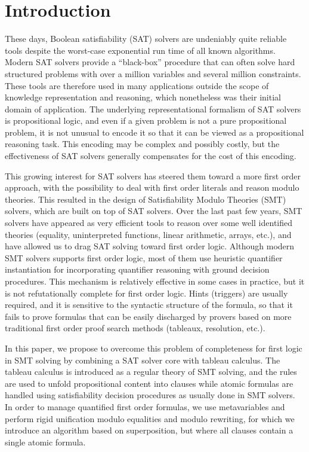 
\section{Introduction}

These days, Boolean satisfiability (SAT) solvers are undeniably quite reliable
tools despite the worst-case exponential run time of all known
algorithms. Modern SAT solvers provide a ``black-box'' procedure that can often
solve hard structured problems with over a million variables and several million
constraints. These tools are therefore used in many applications outside the
scope of knowledge representation and reasoning, which nonetheless was their
initial domain of application. The underlying representational formalism of SAT
solvers is propositional logic, and even if a given problem is not a pure
propositional problem, it is not unusual to encode it so that it can be viewed
as a propositional reasoning task. This encoding may be complex and possibly
costly, but the effectiveness of SAT solvers generally compensates for the cost
of this encoding.

This growing interest for SAT solvers has steered them toward a more first order
approach, with the possibility to deal with first order literals and reason
modulo theories. This resulted in the design of Satisfiability Modulo Theories
(SMT) solvers, which are built on top of SAT solvers. Over the last past few
years, SMT solvers have appeared as very efficient tools to reason over some
well identified theories (equality, uninterpreted functions, linear arithmetic,
arrays, etc.), and have allowed us to drag SAT solving toward first order logic.
Although modern SMT solvers supports first order logic, most of them use
heuristic quantifier instantiation for incorporating quantifier reasoning with
ground decision procedures. This mechanism is relatively effective in some cases
in practice, but it is not refutationally complete for first order logic. Hints
(triggers) are usually required, and it is sensitive to the syntactic structure
of the formula, so that it fails to prove formulas that can be easily discharged
by provers based on more traditional first order proof search methods (tableaux,
resolution, etc.).

In this paper, we propose to overcome this problem of completeness for first
logic in SMT solving by combining a SAT solver core with tableau calculus. The
tableau calculus is introduced as a regular theory of SMT solving, and the rules
are used to unfold propositional content into clauses while atomic formulas are
handled using satisfiability decision procedures as usually done in SMT solvers.
In order to manage quantified first order formulas, we use metavariables and
perform rigid unification modulo equalities and modulo rewriting, for which we
introduce an algorithm based on superposition, but where all clauses contain a
single atomic formula.

